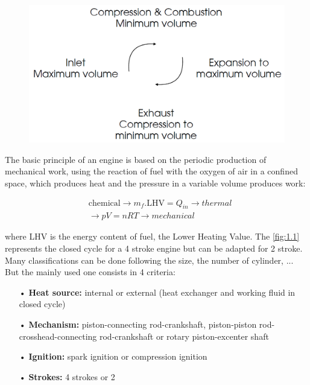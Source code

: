 	\begin{figure}
	\vspace{-5mm}
	\includegraphics[scale=0.2]{ch1/1}
	\label{fig:1.1}
	\end{figure}
	The basic principle of an engine is based on the periodic production of mechanical work, using the reaction of fuel with the oxygen of air in a confined space, which produces heat and the pressure in a variable volume produces work:
	
	\begin{equation}
	\begin{aligned}
	&\mbox{chemical} \rightarrow m_f. \mbox{LHV} = Q_{in} \rightarrow thermal\\
	 &\rightarrow pV = nRT \rightarrow mechanical
	\end{aligned}	
	\end{equation}
	
	where LHV is the energy content of fuel, the Lower Heating Value. The \autoref{fig:1.1} represents the closed cycle for a 4 stroke engine but can be adapted for 2 stroke. \\
	
	Many classifications can be done following the size, the number of cylinder, ... But the mainly used one consists in 4 criteria:\\
	
	\begin{itemize}
		\item[•] \textbf{Heat source:} internal  or external (heat exchanger and working fluid in closed cycle)
		\item[•] \textbf{Mechanism:} piston-connecting rod-crankshaft, piston-piston rod-crosshead-connecting rod-crankshaft or rotary piston-excenter shaft
		\item[•] \textbf{Ignition:} spark ignition or compression ignition
		\item[•] \textbf{Strokes:} 4 strokes or 2
	\end{itemize}	 
	
